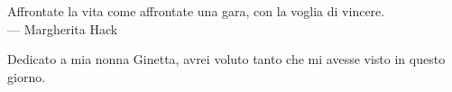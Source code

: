 
\cleardoublepage
{}
\thispagestyle{empty}

\vspace*{3cm}

\begin{center}
Affrontate la vita come affrontate una gara, con la voglia di vincere. \\ \medskip
--- Margherita Hack
\end{center}

\medskip

\begin{center}
Dedicato a mia nonna Ginetta, avrei voluto tanto che mi avesse visto in questo giorno.
\end{center}
